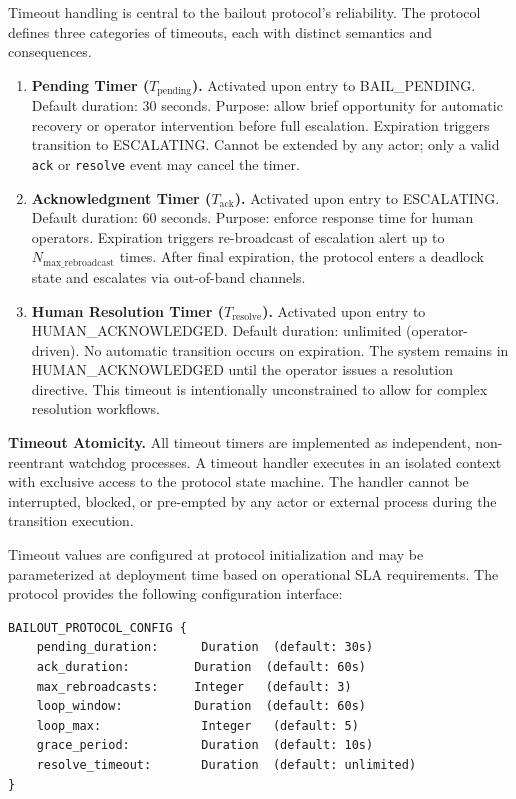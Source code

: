 Timeout handling is central to the bailout protocol's reliability. The protocol defines three categories of timeouts, each with distinct semantics and consequences.

\begin{enumerate}
    \item \textbf{Pending Timer ($T_{\text{pending}}$).} Activated upon entry to BAIL\_PENDING. Default duration: 30 seconds. Purpose: allow brief opportunity for automatic recovery or operator intervention before full escalation. Expiration triggers transition to ESCALATING. Cannot be extended by any actor; only a valid \texttt{ack} or \texttt{resolve} event may cancel the timer.
    
    \item \textbf{Acknowledgment Timer ($T_{\text{ack}}$).} Activated upon entry to ESCALATING. Default duration: 60 seconds. Purpose: enforce response time for human operators. Expiration triggers re-broadcast of escalation alert up to $N_{\text{max\_rebroadcast}}$ times. After final expiration, the protocol enters a deadlock state and escalates via out-of-band channels.
    
    \item \textbf{Human Resolution Timer ($T_{\text{resolve}}$).} Activated upon entry to HUMAN\_ACKNOWLEDGED. Default duration: unlimited (operator-driven). No automatic transition occurs on expiration. The system remains in HUMAN\_ACKNOWLEDGED until the operator issues a resolution directive. This timeout is intentionally unconstrained to allow for complex resolution workflows.
\end{enumerate}

\begin{definition}
\textbf{Timeout Atomicity.} All timeout timers are implemented as independent, non-reentrant watchdog processes. A timeout handler executes in an isolated context with exclusive access to the protocol state machine. The handler cannot be interrupted, blocked, or pre-empted by any actor or external process during the transition execution.
\end{definition}

Timeout values are configured at protocol initialization and may be parameterized at deployment time based on operational SLA requirements. The protocol provides the following configuration interface:

\begin{verbatim}
BAILOUT_PROTOCOL_CONFIG {
    pending_duration:      Duration  (default: 30s)
    ack_duration:         Duration  (default: 60s)
    max_rebroadcasts:     Integer   (default: 3)
    loop_window:          Duration  (default: 60s)
    loop_max:              Integer   (default: 5)
    grace_period:          Duration  (default: 10s)
    resolve_timeout:       Duration  (default: unlimited)
}
\end{verbatim}


